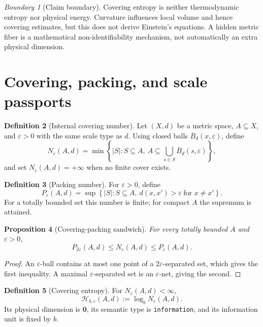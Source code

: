 \documentclass[11pt,a4paper]{article}
\theoremstyle{definition}
\newtheorem{definition}{Definition}[section]
\theoremstyle{plain}
\newtheorem{proposition}[definition]{Proposition}
\theoremstyle{remark}
\newtheorem{warning}[definition]{Boundary}
\newcommand{\Hmet}{\mathscr{H}}
\newcommand{\abs}[1]{\left\lvert #1\right\rvert}
\begin{document}
\begin{warning}[Claim boundary]
Covering entropy is neither thermodynamic entropy nor physical energy.
Curvature influences local volume and hence covering estimates, but this
does not derive Einstein's equations. A hidden metric fiber is a
mathematical non-identifiability mechanism, not automatically an extra
physical dimension.
\end{warning}

\section{Covering, packing, and scale passports}

\begin{definition}[Internal covering number]
Let $(X,d)$ be a metric space, $A\subseteq X$, and $\varepsilon>0$ with the
same scale type as $d$. Using closed balls
$\overline B_d(x,\varepsilon)$, define
\[
N_\varepsilon(A,d)
=
\min\left\{
\abs{S}:
S\subseteq A,\ 
A\subseteq\bigcup_{s\in S}\overline B_d(s,\varepsilon)
\right\},
\]
and set $N_\varepsilon(A,d)=+\infty$ when no finite cover exists.
\end{definition}

\begin{definition}[Packing number]
For $\varepsilon>0$, define
\[
P_\varepsilon(A,d)
=
\sup\left\{
\abs{S}:
S\subseteq A,\ 
d(x,x')>\varepsilon\ \text{for }x\neq x'
\right\}.
\]
For a totally bounded set this number is finite; for compact $A$ the
supremum is attained.
\end{definition}

\begin{proposition}[Covering-packing sandwich]
\label{prop:packing-covering}
For every totally bounded $A$ and $\varepsilon>0$,
\[
P_{2\varepsilon}(A,d)
\leq
N_\varepsilon(A,d)
\leq
P_\varepsilon(A,d).
\]
\end{proposition}

\begin{proof}
An $\varepsilon$-ball contains at most one point of a
$2\varepsilon$-separated set, which gives the first inequality. A maximal
$\varepsilon$-separated set is an $\varepsilon$-net, giving the second.
\end{proof}

\begin{definition}[Covering entropy]
For $N_\varepsilon(A,d)<\infty$,
\[
\Hmet_{b,\varepsilon}(A,d)
:=
\log_bN_\varepsilon(A,d).
\]
Its physical dimension is $\mathbf0$, its semantic type is
\texttt{information}, and its information unit is fixed by $b$.
\end{definition}
\end{document}
